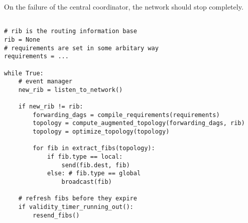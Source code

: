 \documentclass[10pt,\jkfside,a4paper]{article}
\begin{document}
\begin{enumerate}
\begin{definition}
    \end{definition}

    \begin{definition}

        On the failure of the central coordinator, the network should stop completely.

    \end{definition}

    \begin{lstlisting}

# rib is the routing information base
rib = None
# requirements are set in some arbitary way
requirements = ...

while True:
    # event manager
    new_rib = listen_to_network()

    if new_rib != rib:
        forwarding_dags = compile_requirements(requirements)
        topology = compute_augmented_topology(forwarding_dags, rib)
        topology = optimize_topology(topology)

        for fib in extract_fibs(topology):
            if fib.type == local:
                send(fib.dest, fib)
            else: # fib.type == global
                broadcast(fib)

    # refresh fibs before they expire
    if validity_timer_running_out():
        resend_fibs()

    \end{lstlisting}

\end{enumerate}
\end{document}
